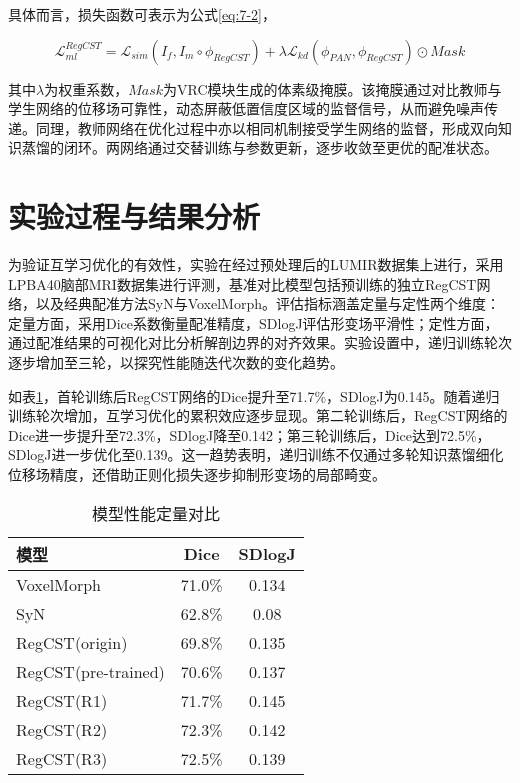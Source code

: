 具体而言，损失函数可表示为公式\ref{eq:7-2}，

\begin{equation}
    \mathcal{L}_{ml}^{RegCST}=\mathcal{L}_{sim}(I_f,I_m\circ \phi_{RegCST})+\lambda\mathcal{L}_{kd}(\phi_{PAN},\phi_{RegCST})\odot Mask
    \label{eq:7-2}
\end{equation}

其中$\lambda$为权重系数，$Mask$为VRC模块生成的体素级掩膜。该掩膜通过对比教师与学生网络的位移场可靠性，动态屏蔽低置信度区域的监督信号，从而避免噪声传递。同理，教师网络在优化过程中亦以相同机制接受学生网络的监督，形成双向知识蒸馏的闭环。两网络通过交替训练与参数更新，逐步收敛至更优的配准状态。





\section{实验过程与结果分析}

为验证互学习优化的有效性，实验在经过预处理后的LUMIR数据集上进行，采用LPBA40脑部MRI数据集进行评测，基准对比模型包括预训练的独立RegCST网络，以及经典配准方法SyN与VoxelMorph。评估指标涵盖定量与定性两个维度：定量方面，采用Dice系数衡量配准精度，SDlogJ评估形变场平滑性；定性方面，通过配准结果的可视化对比分析解剖边界的对齐效果。实验设置中，递归训练轮次逐步增加至三轮，以探究性能随迭代次数的变化趋势。

如表\ref{tab:7-1}，首轮训练后RegCST网络的Dice提升至71.7\%，SDlogJ为0.145。随着递归训练轮次增加，互学习优化的累积效应逐步显现。第二轮训练后，RegCST网络的Dice进一步提升至72.3\%，SDlogJ降至0.142；第三轮训练后，Dice达到72.5\%，SDlogJ进一步优化至0.139。这一趋势表明，递归训练不仅通过多轮知识蒸馏细化位移场精度，还借助正则化损失逐步抑制形变场的局部畸变。

\begin{table}[h]
    \centering
    \caption{模型性能定量对比}
    \label{tab:7-1}
    \begin{tabular}{lcc}
        \toprule
        \textbf{模型}         & \textbf{Dice} & \textbf{SDlogJ} \\
        \midrule
        VoxelMorph          & 71.0\%        & 0.134           \\
        SyN                 & 62.8\%        & 0.08            \\
        RegCST(origin)      & 69.8\%        & 0.135           \\
        RegCST(pre-trained) & 70.6\%        & 0.137           \\
        RegCST(R1)          & 71.7\%        & 0.145           \\
        RegCST(R2)          & 72.3\%        & 0.142           \\
        RegCST(R3)          & 72.5\%        & 0.139           \\
        \bottomrule
    \end{tabular}
\end{table}



